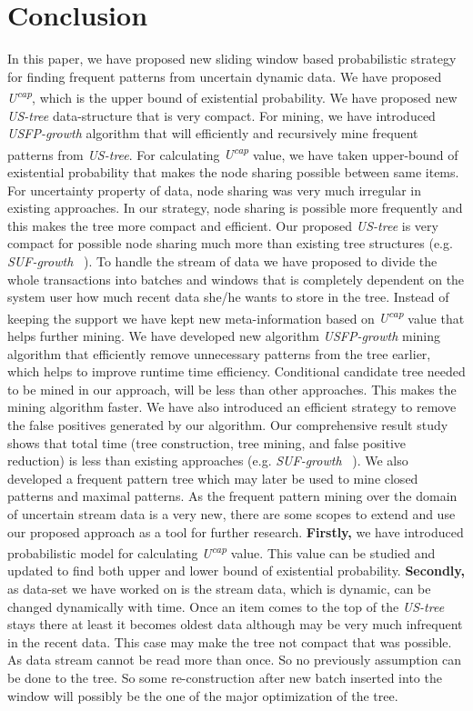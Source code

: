 \documentclass[conference]{IEEEtran}
\begin{document}
\section{Conclusion}
In this paper, we have proposed new sliding window based probabilistic strategy for finding frequent patterns from uncertain dynamic data. We have proposed \emph{U\textsuperscript{cap}}, which is the upper bound of existential probability. We have proposed new \emph{US-tree} data-structure that is very compact. For mining, we have introduced \emph{USFP-growth} algorithm that will efficiently and recursively mine frequent patterns from \emph{US-tree}.
For calculating \emph{U\textsuperscript{cap}} value, we have taken upper-bound of existential probability that makes the node sharing possible between same items. For uncertainty property of data, node sharing was very much irregular in existing approaches. In our strategy, node sharing is possible more frequently and this makes the tree more compact and efficient. Our proposed \emph{US-tree} is very compact for possible node sharing much more than existing tree structures (e.g. \emph{SUF-growth} ~\cite{suf_growth}). To handle the stream of data we have proposed to divide the whole transactions into batches and windows that is completely dependent on the system user how much recent data she/he wants to store in the tree. Instead of keeping the support we have kept new meta-information based on \emph{U\textsuperscript{cap}} value that helps further mining. We have developed new algorithm \emph{USFP-growth} mining algorithm that efficiently remove unnecessary patterns from the tree earlier, which helps to improve runtime time efficiency. Conditional candidate tree needed to be mined in our approach, will be less than other approaches. This makes the mining algorithm faster. We have also introduced an efficient strategy to remove the false positives generated by our algorithm. Our comprehensive result study shows that total time (tree construction, tree mining, and false positive reduction) is less than existing approaches (e.g. \emph{SUF-growth} ~\cite{suf_growth}). We also developed a frequent pattern tree which may later be used to mine closed patterns and maximal patterns.
As the frequent pattern mining over the domain of uncertain stream data is a very new, there are some scopes to extend and use our proposed approach as a tool for further research.
\textbf{Firstly,} we have introduced probabilistic model for calculating \emph{U\textsuperscript{cap}} value. This value can be studied and updated to find both upper and lower bound of existential probability.
\textbf{Secondly,} as data-set we have worked on is the stream data, which is dynamic, can be changed dynamically with time. Once an item comes to the top of the \emph{US-tree} stays there at least it becomes oldest data although may be very much infrequent in the recent data. This case may make the tree not compact that was possible. As data stream cannot be read more than once. So no previously assumption can be done to the tree. So some re-construction after new batch inserted into the window will possibly be the one of the major optimization of the tree.



%


\end{document}
